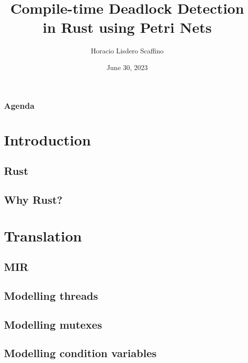 \documentclass{beamer}
\title[Compile-time Deadlock Detection in Rust]{Compile-time Deadlock Detection in Rust using Petri Nets}
\author{Horacio Lisdero Scaffino}
\institute[FIUBA]{Facultad de Ingeniería\\Universidad de Buenos Aires}
\date{June 30, 2023}
\begin{document}
\begin{frame}
  \titlepage
\end{frame}

\logo{}

\begin{frame}
  \frametitle{Agenda}
  \tableofcontents
\end{frame}

\section{Introduction}

\subsection{Rust}

\subsection{Why Rust?}

\section{Translation}

\subsection{MIR}

\subsection{Modelling threads}

\subsection{Modelling mutexes}

\subsection{Modelling condition variables}
\end{document}
